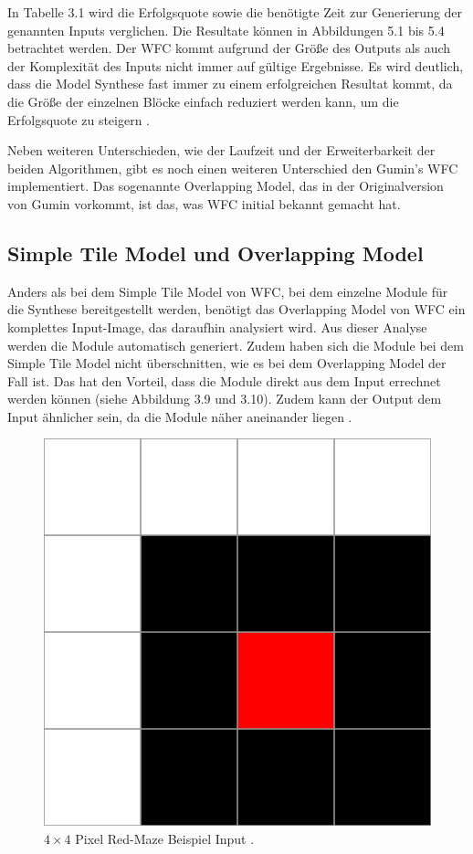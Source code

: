\documentclass[12pt, a4paper,twoside,openany]{report} %
\begin{document}
In Tabelle 3.1 wird die Erfolgsquote sowie die benötigte Zeit zur Generierung der genannten Inputs verglichen.
Die Resultate können in Abbildungen 5.1 bis 5.4 betrachtet werden.
Der WFC kommt aufgrund der Größe des Outputs als auch der Komplexität des Inputs nicht immer auf gültige Ergebnisse.
Es wird deutlich, dass die Model Synthese fast immer zu einem erfolgreichen Resultat kommt,
da die Größe der einzelnen Blöcke einfach reduziert werden kann, um die Erfolgsquote zu steigern \cite{merrell2018compare}.\par

Neben weiteren Unterschieden, wie der Laufzeit und der Erweiterbarkeit der beiden Algorithmen, gibt es noch einen weiteren Unterschied den Gumin's WFC implementiert.
Das sogenannte Overlapping Model, das in der Originalversion von Gumin vorkommt, ist das, was WFC initial bekannt gemacht hat.

\pagebreak

\subsection{Simple Tile Model und Overlapping Model}

Anders als bei dem Simple Tile Model von WFC, bei dem einzelne Module für die Synthese bereitgestellt werden,
benötigt das Overlapping Model von WFC ein komplettes Input-Image, das daraufhin analysiert wird.
Aus dieser Analyse werden die Module automatisch generiert.
Zudem haben sich die Module bei dem Simple Tile Model nicht überschnitten, wie es bei dem Overlapping Model der Fall ist.
Das hat den Vorteil, dass die Module direkt aus dem Input errechnet werden können {(siehe Abbildung 3.9 und 3.10)}.
Zudem kann der Output dem Input ähnlicher sein, da die Module näher aneinander liegen \cite{merrell2018compare}.

\begin{figure}[H]
    \centering
    \includegraphics[width=0.5\linewidth]{images/red-maze.jpg}%
    \caption{$4\times 4$ Pixel Red-Maze Beispiel Input \cite{Karth2017WaveFunctionCollapseIC}.}%
\end{figure}
\end{document}
